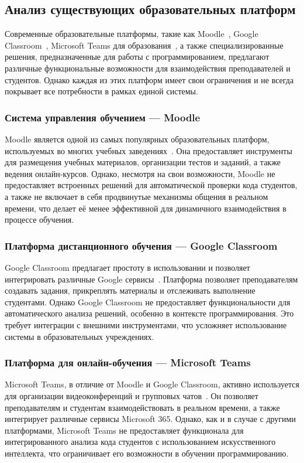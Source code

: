 \subsection{Анализ существующих образовательных платформ}

Современные образовательные платформы, такие как Moodle~\cite{moodle_docs}, Google Classroom~\cite{google_classroom}, Microsoft Teams для образования~\cite{microsoft_teams_education}, а также специализированные решения, предназначенные для работы с программированием, предлагают различные функциональные возможности для взаимодействия преподавателей и студентов. Однако каждая из этих платформ имеет свои ограничения и не всегда покрывает все потребности в рамках единой системы.

\subsubsection{Система управления обучением — Moodle}
Moodle является одной из самых популярных образовательных платформ, используемых во многих учебных заведениях~\cite{moodle_docs}. Она предоставляет инструменты для размещения учебных материалов, организации тестов и заданий, а также ведения онлайн-курсов. Однако, несмотря на свои возможности, Moodle не предоставляет встроенных решений для автоматической проверки кода студентов, а также не включает в себя продвинутые механизмы общения в реальном времени, что делает её менее эффективной для динамичного взаимодействия в процессе обучения.

\subsubsection{Платформа дистанционного обучения — Google Classroom}
Google Classroom предлагает простоту в использовании и позволяет интегрировать различные Google сервисы~\cite{google_classroom}. Платформа позволяет преподавателям создавать задания, прикреплять материалы и отслеживать выполнение студентами. Однако Google Classroom не предоставляет функциональности для автоматического анализа решений, особенно в контексте программирования. Это требует интеграции с внешними инструментами, что усложняет использование системы в образовательных учреждениях.

\subsubsection{Платформа для онлайн-обучения — Microsoft Teams}
Microsoft Teams, в отличие от Moodle и Google Classroom, активно используется для организации видеоконференций и групповых чатов~\cite{microsoft_teams_education}. Он позволяет преподавателям и студентам взаимодействовать в реальном времени, а также интегрирует различные сервисы Microsoft 365. Однако, как и в случае с другими платформами, Microsoft Teams не предоставляет функционала для интегрированного анализа кода студентов с использованием искусственного интеллекта, что ограничивает его возможности в обучении программированию.

